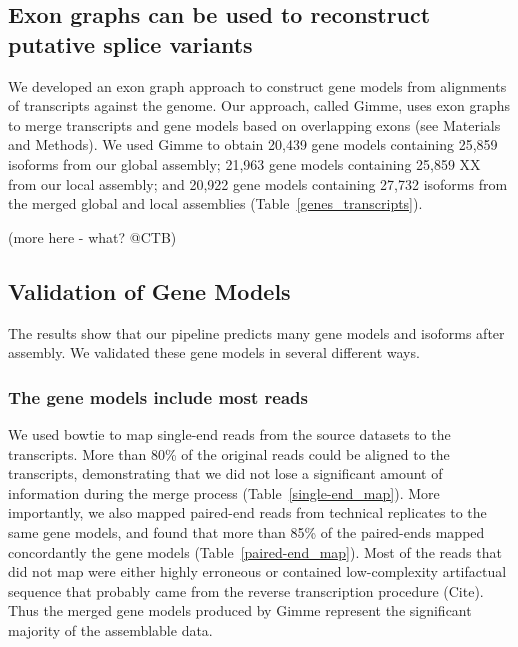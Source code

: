 \documentclass[10pt]{article}
\begin{document}

\subsection*{Exon graphs can be used to reconstruct putative splice variants}

We developed an exon graph approach to construct gene models from
alignments of transcripts against the genome.  Our approach, called
Gimme, uses exon graphs to merge transcripts and gene models based on
overlapping exons (see Materials and Methods).  We used Gimme to
obtain 20,439 gene models containing 25,859 isoforms from our global
assembly; 21,963 gene models containing 25,859 XX from our local
assembly; and 20,922 gene models containing 27,732 isoforms from the
merged global and local assemblies (Table~\ref{genes_transcripts}).

(more here - what? @CTB)

\subsection*{Validation of Gene Models}

The results show that our pipeline predicts many gene models and
isoforms after assembly.  We validated these gene models in several
different ways.

\subsubsection*{The gene models include most reads}

We used bowtie to map single-end reads from the source datasets to the
transcripts.  More than 80\% of the original reads could be aligned to
the transcripts, demonstrating that we did not lose a significant
amount of information during the merge process
(Table~\ref{single-end_map}).  More importantly, we also mapped
paired-end reads from technical replicates to the same gene models,
and found that more than 85\% of the paired-ends mapped concordantly
the gene models (Table~\ref{paired-end_map}).  Most of the reads that
did not map were either highly erroneous or contained low-complexity
artifactual sequence that probably came from the reverse transcription
procedure (Cite).
Thus the merged gene models produced by Gimme represent the significant
majority of the assemblable data.
\end{document}

